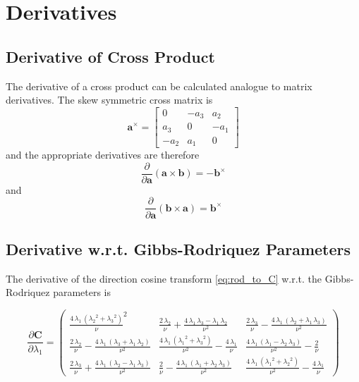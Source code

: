 \chapter{Derivatives}
\label{app:derivatives}

\section{Derivative of Cross Product}
\label{sec:app_d_cross_product}
The derivative of a cross product can be calculated analogue to matrix derivatives.
The skew symmetric cross matrix is
\begin{equation}
\mathbf{a}^\times = \left[
\begin{array}{ccc}
0 & -a_3 & a_2 \\
a_3 & 0 & -a_1 \\
-a_2 & a_1 & 0
\end{array} \right]
\end{equation}
and the appropriate derivatives are therefore
\begin{equation}
\frac{\partial}{\partial \mathbf{a}} \left( \mathbf{a} \times \mathbf{b} \right)
= - \mathbf{b}^\times
\end{equation}
and
\begin{equation}
\frac{\partial}{\partial \mathbf{a}} \left( \mathbf{b} \times \mathbf{a} \right)
=  \mathbf{b}^\times
\end{equation}

\section{Derivative w.r.t. Gibbs-Rodriquez Parameters}
\label{sec:app_dwrt_rodriquez}
The derivative of the direction cosine transform \eqref{eq:rod_to_C} w.r.t. the Gibbs-Rodriquez parameters is

\begin{equation*}
\frac{\partial \mathbf{C}}{\partial \lambda_1} = 
\left(\begin{array}{ccc} 
\frac{4\, {\lambda_1}\, \left({{\lambda_2}}^2 + {{\lambda_3}}^2\right)}{\nu}^2 & 
\frac{2\, {\lambda_2}}{\nu} + \frac{4\, {\lambda_1}\, {\lambda_3} - {\lambda_1}\, {\lambda_2}}{\nu^2} & 
\frac{2\, {\lambda_3}}{\nu} - \frac{4\, {\lambda_1}\, \left({\lambda_2} + {\lambda_1}\, {\lambda_3}\right)}{\nu^2}\\ 
\frac{2\, {\lambda_2}}{\nu} - \frac{4\, {\lambda_1}\, \left({\lambda_3} + {\lambda_1}\, {\lambda_2}\right)}{\nu^2} & 
\frac{4\, {\lambda_1}\, \left({{\lambda_1}}^2 + {{\lambda_3}}^2\right)}{\nu^2} - \frac{4\, {\lambda_1}}{\nu} &
\frac{4\, {\lambda_1}\, \left({\lambda_1} - {\lambda_2}\, {\lambda_3}\right)}{\nu^2} - \frac{2}{\nu}\\
\frac{2\, {\lambda_3}}{\nu} + \frac{4\, {\lambda_1}\, \left({\lambda_2} - {\lambda_1}\, {\lambda_3}\right)}{\nu^2} &
\frac{2}{\nu} - \frac{4\, {\lambda_1}\, \left({\lambda_1} + {\lambda_2}\, {\lambda_3}\right)}{\nu^2} & \frac{4\, {\lambda_1}\, \left({{\lambda_1}}^2 + {{\lambda_2}}^2\right)}{\nu^2} - \frac{4\, {\lambda_1}}{\nu}
\end{array}\right)
\end{equation*}

